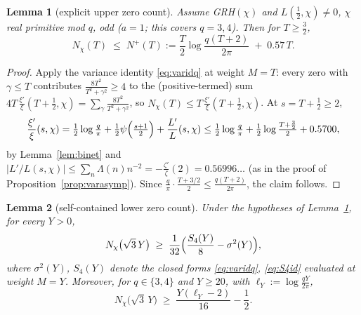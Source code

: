 \documentclass[11pt]{article}
\newtheorem{lemma}{Lemma}
\begin{document}
\begin{lemma}[explicit upper zero count]\label{lem:Nplus}
Assume GRH$(\chi)$ and $L(\tfrac12,\chi)\ne0$, $\chi$ real primitive
mod $q$, odd ($a=1$; this covers $q=3,4$). Then for $T\ge\tfrac32$,
\[
N_\chi(T)\;\le\;N^+(T):=\frac T2\log\frac{q(T+2)}{2\pi}\;+\;0.57\,T .
\]
\end{lemma}

\begin{proof}
Apply the variance identity \eqref{eq:varidq} at weight $M=T$: every
zero with $\gamma\le T$ contributes
$\frac{8T^2}{T^2+\gamma^2}\ge4$ to the (positive-termed) sum
$4T\,\frac{\xi'}{\xi}(T+\tfrac12,\chi)
=\sum_\gamma\frac{8T^2}{T^2+\gamma^2}$, so
$N_\chi(T)\le T\,\frac{\xi'}{\xi}(T+\tfrac12,\chi)$. At
$s=T+\tfrac12\ge2$,
\[
\frac{\xi'}{\xi}(s,\chi)
=\tfrac12\log\tfrac q\pi+\tfrac12\psi\Bigl(\tfrac{s+1}2\Bigr)
+\frac{L'}{L}(s,\chi)
\le\tfrac12\log\tfrac q\pi+\tfrac12\log\tfrac{T+\frac32}2+0.5700,
\]
by Lemma~\ref{lem:binet} and
$|L'/L(s,\chi)|\le\sum_n\Lambda(n)n^{-2}
=-\tfrac{\zeta'}\zeta(2)=0.56996\ldots$ (as in the proof of
Proposition~\ref{prop:varasymp}). Since
$\tfrac q\pi\cdot\tfrac{T+3/2}2\le\tfrac{q(T+2)}{2\pi}$, the claim
follows.
\end{proof}

\begin{lemma}[self-contained lower zero count]\label{lem:Nlow}
Under the hypotheses of Lemma~\ref{lem:Nplus}, for every $Y>0$,
\begin{equation}\label{eq:Nlow}
N_\chi\bigl(\sqrt3\,Y\bigr)\;\ge\;
\frac1{32}\Bigl(\frac{S_4(Y)}{8}-\sigma^2(Y)\Bigr),
\end{equation}
where $\sigma^2(Y)$, $S_4(Y)$ denote the closed forms
\eqref{eq:varidq}, \eqref{eq:S4id} evaluated at weight $M=Y$.
Moreover, for $q\in\{3,4\}$ and $Y\ge20$, with
$\ell_Y:=\log\frac{qY}{2\pi}$,
\begin{equation}\label{eq:Nlowexp}
N_\chi\bigl(\sqrt3\,Y\bigr)\;\ge\;\frac{Y(\ell_Y-2)}{16}-\frac12 .
\end{equation}
\end{lemma}
\end{document}

